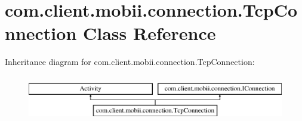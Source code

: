 \hypertarget{classcom_1_1client_1_1mobii_1_1connection_1_1_tcp_connection}{\section{com.\-client.\-mobii.\-connection.\-Tcp\-Connection Class Reference}
\label{classcom_1_1client_1_1mobii_1_1connection_1_1_tcp_connection}
}
Inheritance diagram for com.\-client.\-mobii.\-connection.\-Tcp\-Connection\-:\begin{figure}[H]
\begin{center}
\leavevmode
\includegraphics[height=2.000000cm]{classcom_1_1client_1_1mobii_1_1connection_1_1_tcp_connection}
\end{center}
\end{figure}
